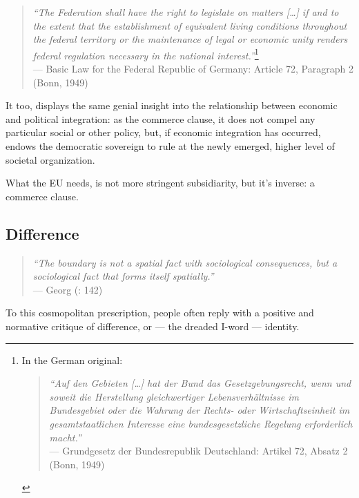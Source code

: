 \documentclass[11pt,a4paper,oneside,openright]{article}
\begin{document}
\begin{quote}
	\emph{``The Federation shall have the right to legislate on matters [\ldots] if and to the extent that the establishment of equivalent living conditions throughout the federal territory or the maintenance of legal or economic unity renders federal regulation necessary in the national interest.''}\footnote{
		In the German original:
			\begin{quote}
				\emph{``Auf den Gebieten [\ldots] hat der Bund das Gesetzgebungsrecht, wenn und soweit die Herstellung gleichwertiger Lebensverhältnisse im Bundesgebiet oder die Wahrung der Rechts- oder Wirtschaftseinheit im gesamtstaatlichen Interesse eine bundesgesetzliche Regelung erforderlich macht.''}\\
				--- Grundgesetz der Bundesrepublik Deutschland: Artikel 72, Absatz 2 (Bonn, 1949)
			\end{quote}}\\
	--- Basic Law for the Federal Republic of Germany: Article 72, Paragraph 2 (Bonn, 1949)
\end{quote}

It too, displays the same genial insight into the relationship between economic and political integration: 
as the commerce clause, it does not compel any particular social or other policy, but, if economic integration has occurred, endows the democratic sovereign to rule at the newly emerged, higher level of societal organization.


What the \gls{EU} needs, is not more stringent subsidiarity, but it's inverse: 
a commerce clause.

\subsection[Difference]{Difference} \label{sec:ID-Difference} 

\begin{quote}
	\emph{``The boundary is not a spatial fact with sociological consequences, but a sociological fact that forms itself spatially.''} \\
	--- Georg \citeauthor{Simmel1903} (\citeyear{Simmel1903}: 142)
\end{quote}

To this cosmopolitan prescription, people often reply with a positive and normative critique of difference, or --- the dreaded I-word --- identity. 
\end{document}
